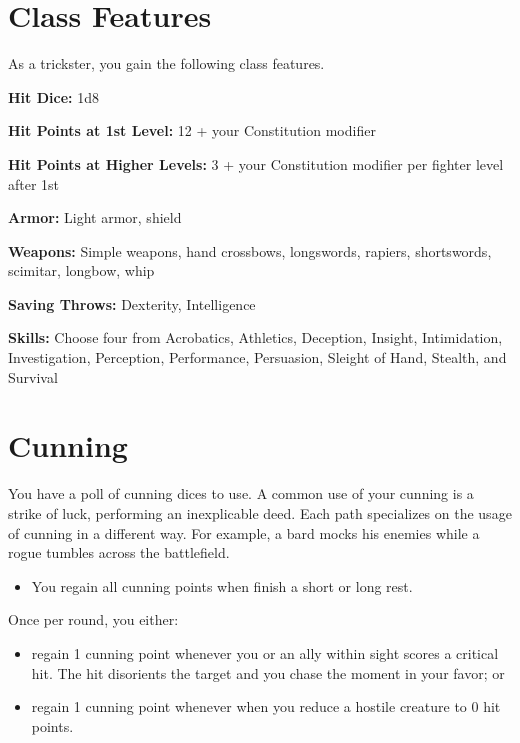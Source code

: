 \begin{multicols*}{2}

\section*{Class Features} 

As a trickster, you gain the following class features.

\textbf{Hit Dice:} 1d8

\textbf{Hit Points at 1st Level:} 12 + your Constitution modifier

\textbf{Hit Points at Higher Levels:} 3 + your Constitution modifier per fighter level after 1st


\textbf{Armor:} Light armor, shield

\textbf{Weapons:} Simple weapons, hand crossbows, longswords, rapiers, shortswords, scimitar, longbow, whip

\textbf{Saving Throws:} Dexterity, Intelligence

\textbf{Skills:} Choose four from Acrobatics, Athletics, Deception, Insight, Intimidation, Investigation, Perception, Performance, Persuasion, Sleight of Hand, Stealth, and Survival
    
\section*{Cunning} 

You have a poll of cunning dices to use. A common use of your cunning is a strike of luck, performing an inexplicable deed. Each path specializes on the usage of cunning in a different way. For example, a bard mocks his enemies while a rogue tumbles across the battlefield.



\begin{itemize}
    \item You regain all cunning points when finish a short or long rest.
\end{itemize}

Once per round, you either:

\begin{itemize}
    \item regain 1 cunning point whenever you or an ally within sight scores a critical hit. The hit disorients the target and you chase the moment in your favor; or
    \item regain 1 cunning point whenever when you reduce a hostile creature to 0 hit points.
\end{itemize}



\end{multicols*}
